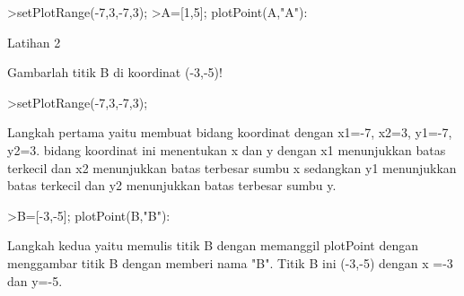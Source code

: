 \documentclass[a4paper,10pt]{article}
\begin{document}
\begin{eulernotebook}
\begin{eulercomment}
\begin{eulercomment}
\begin{eulercomment}
\end{eulercomment}
\begin{eulerprompt}
>setPlotRange(-7,3,-7,3);
>A=[1,5]; plotPoint(A,"A"):
\end{eulerprompt}
\begin{eulercomment}
Latihan 2\\
\end{eulercomment}
\eulersubheading{}
\begin{eulercomment}
Gambarlah titik B di koordinat (-3,-5)!
\end{eulercomment}
\begin{eulerprompt}
>setPlotRange(-7,3,-7,3);
\end{eulerprompt}
\begin{eulercomment}
Langkah pertama yaitu membuat bidang koordinat dengan x1=-7, x2=3,
y1=-7, y2=3. bidang koordinat ini menentukan x dan y dengan x1
menunjukkan batas terkecil dan x2 menunjukkan batas terbesar sumbu x
sedangkan y1 menunjukkan batas terkecil dan y2 menunjukkan batas
terbesar sumbu y. 
\end{eulercomment}
\begin{eulerprompt}
>B=[-3,-5]; plotPoint(B,"B"):
\end{eulerprompt}
\begin{eulercomment}
Langkah kedua yaitu memulis titik B dengan memanggil plotPoint dengan
menggambar titik B dengan memberi nama "B". Titik B ini (-3,-5) dengan
x =-3 dan y=-5.


\end{eulercomment}
\end{eulercomment}
\end{eulercomment}
\end{eulernotebook}
\end{document}
